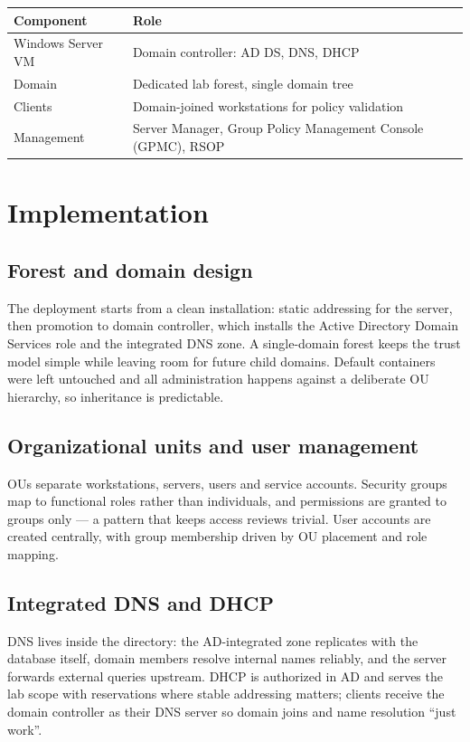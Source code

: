 \documentclass[11pt,a4paper]{article}
\begin{document}
\begin{table}[h]
\centering
\renewcommand{\arraystretch}{1.3}
\begin{tabular}{l l}
\textbf{Component} & \textbf{Role}\\
\hline
Windows Server VM & Domain controller: AD DS, DNS, DHCP\\
Domain & Dedicated lab forest, single domain tree\\
Clients & Domain-joined workstations for policy validation\\
Management & Server Manager, Group Policy Management Console (GPMC), RSOP\\
\end{tabular}
\end{table}

\section{Implementation}
\subsection{Forest and domain design}
The deployment starts from a clean installation: static addressing for the
server, then promotion to domain controller, which installs the Active Directory
Domain Services role and the integrated DNS zone. A single-domain forest keeps
the trust model simple while leaving room for future child domains. Default
containers were left untouched and all administration happens against a
deliberate OU hierarchy, so inheritance is predictable.

\subsection{Organizational units and user management}
OUs separate workstations, servers, users and service accounts. Security groups
map to functional roles rather than individuals, and permissions are granted to
groups only --- a pattern that keeps access reviews trivial. User accounts are
created centrally, with group membership driven by OU placement and role mapping.

\subsection{Integrated DNS and DHCP}
DNS lives inside the directory: the AD-integrated zone replicates with the
database itself, domain members resolve internal names reliably, and the server
forwards external queries upstream. DHCP is authorized in AD and serves the
lab scope with reservations where stable addressing matters; clients receive
the domain controller as their DNS server so domain joins and name resolution
``just work''.
\end{document}

